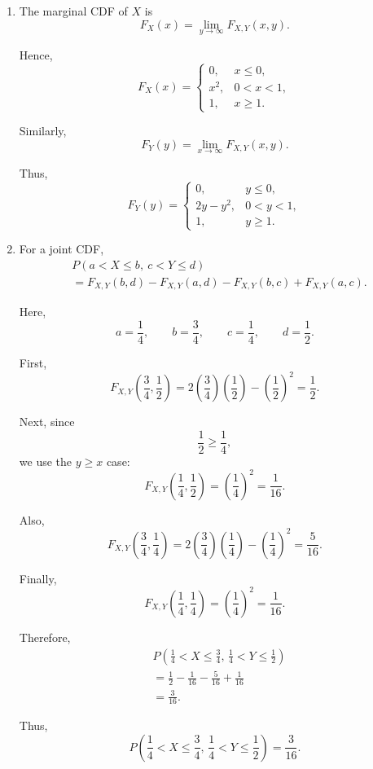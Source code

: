 \documentclass[11pt]{article}
\newenvironment{solution}{
    \par
    \begin{tcolorbox}[
        colback=white,
        colframe=uwgold,
        boxrule=0.7pt,
        arc=2mm,
        left=3mm,
        right=3mm,
        top=2mm,
        bottom=2mm,
        breakable,
        before skip=0.5em,
        after skip=1em,
        title=\textbf{Solution},
        coltitle=uwpurple,
        fonttitle=\bfseries
    ]
}{
    \end{tcolorbox}
}
\begin{document}
\begin{solution}
\begin{enumerate}[label=(\alph*)]
\item The marginal CDF of \(X\) is
\[
F_X(x)
=
\lim_{y\to\infty}
F_{X,Y}(x,y).
\]

Hence,
\[
F_X(x)
=
\begin{cases}
0,
&
x\leq0,\\[1mm]
x^2,
&
0<x<1,\\[1mm]
1,
&
x\geq1.
\end{cases}
\]

Similarly,
\[
F_Y(y)
=
\lim_{x\to\infty}
F_{X,Y}(x,y).
\]

Thus,
\[
F_Y(y)
=
\begin{cases}
0,
&
y\leq0,\\[1mm]
2y-y^2,
&
0<y<1,\\[1mm]
1,
&
y\geq1.
\end{cases}
\]

\item For a joint CDF,
\[
\begin{aligned}
&P(a<X\leq b,\ c<Y\leq d)\\
&=
F_{X,Y}(b,d)
-
F_{X,Y}(a,d)
-
F_{X,Y}(b,c)
+
F_{X,Y}(a,c).
\end{aligned}
\]

Here,
\[
a=\frac14,
\qquad
b=\frac34,
\qquad
c=\frac14,
\qquad
d=\frac12.
\]

First,
\[
F_{X,Y}\left(\frac34,\frac12\right)
=
2\left(\frac34\right)\left(\frac12\right)
-
\left(\frac12\right)^2
=
\frac12.
\]

Next, since
\[
\frac12\geq\frac14,
\]
we use the \(y\geq x\) case:
\[
F_{X,Y}\left(\frac14,\frac12\right)
=
\left(\frac14\right)^2
=
\frac1{16}.
\]

Also,
\[
F_{X,Y}\left(\frac34,\frac14\right)
=
2\left(\frac34\right)\left(\frac14\right)
-
\left(\frac14\right)^2
=
\frac5{16}.
\]

Finally,
\[
F_{X,Y}\left(\frac14,\frac14\right)
=
\left(\frac14\right)^2
=
\frac1{16}.
\]

Therefore,
\[
\begin{aligned}
&P\left(
\frac14<X\leq\frac34,\,
\frac14<Y\leq\frac12
\right)\\
&=
\frac12
-
\frac1{16}
-
\frac5{16}
+
\frac1{16}\\
&=
\frac3{16}.
\end{aligned}
\]

Thus,
\[
P\left(
\frac14<X\leq\frac34,\,
\frac14<Y\leq\frac12
\right)
=
\frac3{16}.
\]

\end{enumerate}

\end{solution}
\end{document}
